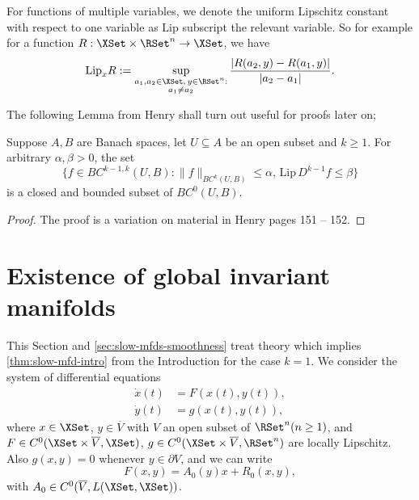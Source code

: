 \documentclass[a4paper]{siamart190516}
\newcommand{\Lip}{\text{Lip}}
\begin{document}
For functions of multiple variables, we denote the uniform Lipschitz constant with respect to one variable as $\Lip$ subscript the relevant variable. So for example for a function $R: \XSet \times \RSet^n \rightarrow \XSet$, we have
\[
\Lip_x  R := \sup_{\substack{a_1,a_2 \in \XSet, \, y \in \RSet^n: \\ a_1 \neq a_2}} \frac{| R(a_2,y)-R(a_1,y)|}{|a_2-a_1|}.
\]

The following Lemma from Henry \cite{He81} shall turn out useful for proofs later on;

 \begin{lemma}\label{closedsubset}
Suppose $A,B$ are Banach spaces, let $U \subseteq A$ be an open subset and $k \geq 1$. For arbitrary $\alpha, \beta > 0$, the set
\[
\{ f \in BC^{k-1,k}(U,B) : \| f \|_{BC^k(U,B)} \leq \alpha, \, \Lip \, D^{k-1} f \leq \beta \}
\]
 is a closed and bounded subset of $BC^0(U,B)$. 
 \end{lemma}

  \begin{proof}
The proof is a variation on material in Henry \cite{He81} pages 151 -- 152.
  \end{proof}


  
  
  
  \section{Existence of global invariant manifolds}\label{sec:slow-mfds-existence}
  
This Section and \cref{sec:slow-mfds-smoothness} treat theory which implies 
\cref{thm:slow-mfd-intro} from the Introduction for the case $k=1$. We consider the
system of differential equations
 \begin{equation}\label{ODE-system}
 \begin{aligned}
 \dot{x}(t) &= F(x(t),y(t)), \\
 \dot{y}(t) &= g(x(t),y(t)),
 \end{aligned}
 \end{equation}
 where $x \in \XSet$, $y \in \overline{V}$ with $V$ an open subset of $\RSet^n  (n \geq 1)$, and $F \in C^0(\XSet \times \overline{V},\XSet)$, $g \in C^0(\XSet\times \overline{V}, \RSet^n)$ are locally Lipschitz. Also $g(x,y)=0$ whenever $y \in \partial V$, and we can write 
 \[
 F(x,y)=A_0(y)x+R_0(x,y),
 \]
 with $A_0 \in C^0(\overline{V},L(\XSet,\XSet))$.
\end{document}
